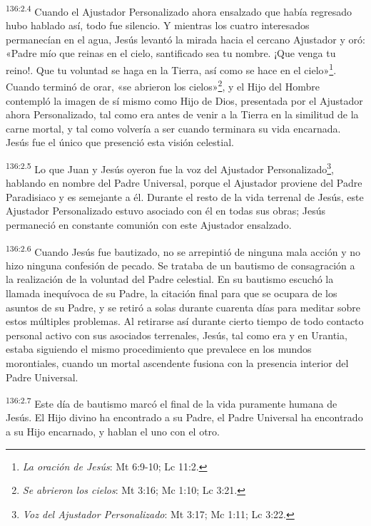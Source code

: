 \par 
\textsuperscript{136:2.4} Cuando el Ajustador Personalizado ahora ensalzado que había regresado hubo hablado así, todo fue silencio. Y mientras los cuatro interesados permanecían en el agua, Jesús levantó la mirada hacia el cercano Ajustador y oró: «Padre mío que reinas en el cielo, santificado sea tu nombre. ¡Que venga tu reino!. Que tu voluntad se haga en la Tierra, así como se hace en el cielo»\footnote{\textit{La oración de Jesús}: Mt 6:9-10; Lc 11:2.}. Cuando terminó de orar, «se abrieron los cielos»\footnote{\textit{Se abrieron los cielos}: Mt 3:16; Mc 1:10; Lc 3:21.}, y el Hijo del Hombre contempló la imagen de sí mismo como Hijo de Dios, presentada por el Ajustador ahora Personalizado, tal como era antes de venir a la Tierra en la similitud de la carne mortal, y tal como volvería a ser cuando terminara su vida encarnada. Jesús fue el único que presenció esta visión celestial.

\par 
\textsuperscript{136:2.5} Lo que Juan y Jesús oyeron fue la voz del Ajustador Personalizado\footnote{\textit{Voz del Ajustador Personalizado}: Mt 3:17; Mc 1:11; Lc 3:22.}, hablando en nombre del Padre Universal, porque el Ajustador proviene del Padre Paradisiaco y es semejante a él. Durante el resto de la vida terrenal de Jesús, este Ajustador Personalizado estuvo asociado con él en todas sus obras; Jesús permaneció en constante comunión con este Ajustador ensalzado.

\par 
\textsuperscript{136:2.6} Cuando Jesús fue bautizado, no se arrepintió de ninguna mala acción y no hizo ninguna confesión de pecado. Se trataba de un bautismo de consagración a la realización de la voluntad del Padre celestial. En su bautismo escuchó la llamada inequívoca de su Padre, la citación final para que se ocupara de los asuntos de su Padre, y se retiró a solas durante cuarenta días para meditar sobre estos múltiples problemas. Al retirarse así durante cierto tiempo de todo contacto personal activo con sus asociados terrenales, Jesús, tal como era y en Urantia, estaba siguiendo el mismo procedimiento que prevalece en los mundos morontiales, cuando un mortal ascendente fusiona con la presencia interior del Padre Universal.

\par 
\textsuperscript{136:2.7} Este día de bautismo marcó el final de la vida puramente humana de Jesús. El Hijo divino ha encontrado a su Padre, el Padre Universal ha encontrado a su Hijo encarnado, y hablan el uno con el otro.

